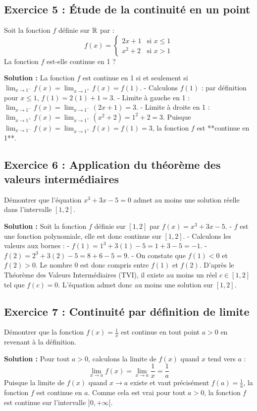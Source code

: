 \subsection*{Exercice 5 : Étude de la continuité en un point}
Soit la fonction $f$ définie sur $\mathbb{R}$ par :
\[
f(x) = 
\begin{cases} 
2x + 1 & \text{si } x \le 1 \\
x^2 + 2 & \text{si } x > 1
\end{cases}
\]
La fonction $f$ est-elle continue en 1 ?

\textbf{Solution :}
La fonction $f$ est continue en 1 si et seulement si $\lim_{x \to 1^-} f(x) = \lim_{x \to 1^+} f(x) = f(1)$.
- Calculons $f(1)$ : par définition pour $x \le 1$, $f(1) = 2(1) + 1 = 3$.
- Limite à gauche en 1 : $\lim_{x \to 1^-} f(x) = \lim_{x \to 1^-} (2x+1) = 3$.
- Limite à droite en 1 : $\lim_{x \to 1^+} f(x) = \lim_{x \to 1^+} (x^2+2) = 1^2 + 2 = 3$.
Puisque $\lim_{x \to 1^-} f(x) = \lim_{x \to 1^+} f(x) = f(1) = 3$, la fonction $f$ est **continue en 1**.

\subsection*{Exercice 6 : Application du théorème des valeurs intermédiaires}
Démontrer que l'équation $x^3 + 3x - 5 = 0$ admet au moins une solution réelle dans l'intervalle $[1, 2]$.

\textbf{Solution :}
Soit la fonction $f$ définie sur $[1, 2]$ par $f(x) = x^3 + 3x - 5$.
- $f$ est une fonction polynomiale, elle est donc continue sur $[1, 2]$.
- Calculons les valeurs aux bornes :
  - $f(1) = 1^3 + 3(1) - 5 = 1 + 3 - 5 = -1$.
  - $f(2) = 2^3 + 3(2) - 5 = 8 + 6 - 5 = 9$.
- On constate que $f(1) < 0$ et $f(2) > 0$. Le nombre 0 est donc compris entre $f(1)$ et $f(2)$.
D'après le Théorème des Valeurs Intermédiaires (TVI), il existe au moins un réel $c \in [1, 2]$ tel que $f(c) = 0$.
L'équation admet donc au moins une solution sur $[1,2]$.

\subsection*{Exercice 7 : Continuité par définition de limite}
Démontrer que la fonction $f(x) = \frac{1}{x}$ est continue en tout point $a > 0$ en revenant à la définition.

\textbf{Solution :}
Pour tout $a > 0$, calculons la limite de $f(x)$ quand $x$ tend vers $a$ :
\[
\lim_{x \to a} f(x) = \lim_{x \to a} \frac{1}{x} = \frac{1}{a}
\]
Puisque la limite de $f(x)$ quand $x \to a$ existe et vaut précisément $f(a) = \frac{1}{a}$, la fonction $f$ est continue en $a$. Comme cela est vrai pour tout $a > 0$, la fonction $f$ est continue sur l'intervalle $]0, +\infty[$.

